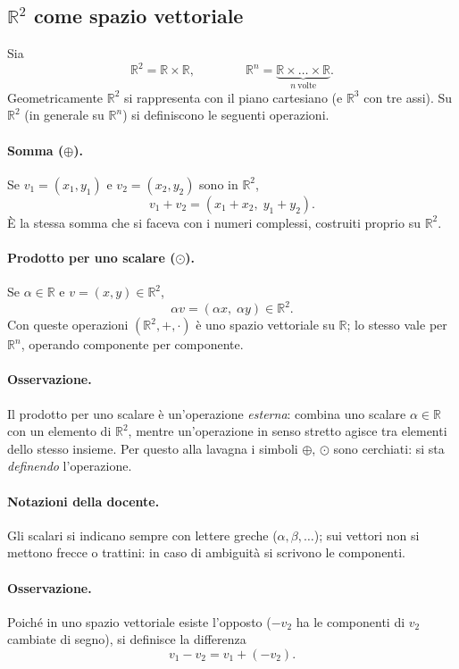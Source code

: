 \subsection{$\mathbb{R}^2$ come spazio vettoriale}

Sia
\[
  \mathbb{R}^2=\mathbb{R}\times\mathbb{R},
  \qquad\qquad
  \mathbb{R}^n=\underbrace{\mathbb{R}\times\dots\times\mathbb{R}}_{n\ \text{volte}} .
\]
Geometricamente $\mathbb{R}^2$ si rappresenta con il piano cartesiano (e $\mathbb{R}^3$ con tre assi). Su $\mathbb{R}^2$ (in generale su $\mathbb{R}^n$) si definiscono le seguenti operazioni.

\paragraph{Somma ($\oplus$).} Se $v_1=(x_1,y_1)$ e $v_2=(x_2,y_2)$ sono in $\mathbb{R}^2$,
\[
  v_1+v_2=(x_1+x_2,\;y_1+y_2).
\]
È la stessa somma che si faceva con i numeri complessi, costruiti proprio su $\mathbb{R}^2$.

\paragraph{Prodotto per uno scalare ($\odot$).} Se $\alpha\in\mathbb{R}$ e $v=(x,y)\in\mathbb{R}^2$,
\[
  \alpha v=(\alpha x,\;\alpha y)\in\mathbb{R}^2 .
\]
Con queste operazioni $(\mathbb{R}^2,+,\cdot)$ è uno spazio vettoriale su $\mathbb{R}$; lo stesso vale per $\mathbb{R}^n$, operando componente per componente.

\paragraph{Osservazione.} Il prodotto per uno scalare è un'operazione \emph{esterna}: combina uno scalare $\alpha\in\mathbb{R}$ con un elemento di $\mathbb{R}^2$, mentre un'operazione in senso stretto agisce tra elementi dello stesso insieme. Per questo alla lavagna i simboli $\oplus$, $\odot$ sono cerchiati: si sta \emph{definendo} l'operazione.

\paragraph{Notazioni della docente.} Gli scalari si indicano sempre con lettere greche ($\alpha,\beta,\dots$); sui vettori non si mettono frecce o trattini: in caso di ambiguità si scrivono le componenti.

\paragraph{Osservazione.} Poiché in uno spazio vettoriale esiste l'opposto ($-v_2$ ha le componenti di $v_2$ cambiate di segno), si definisce la differenza
\[
  v_1-v_2=v_1+(-v_2).
\]

